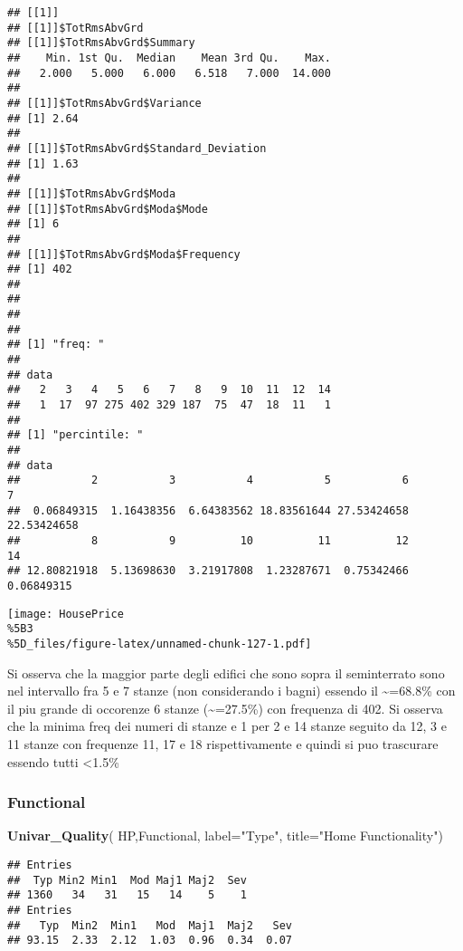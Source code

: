 \documentclass[
]{article}
\newenvironment{Shaded}{\begin{snugshade}}{\end{snugshade}}
\newcommand{\AttributeTok}[1]{\textcolor[rgb]{0.13,0.29,0.53}{#1}}
\newcommand{\FunctionTok}[1]{\textcolor[rgb]{0.13,0.29,0.53}{\textbf{#1}}}
\newcommand{\NormalTok}[1]{#1}
\newcommand{\StringTok}[1]{\textcolor[rgb]{0.31,0.60,0.02}{#1}}
\begin{document}
\begin{verbatim}
## [[1]]
## [[1]]$TotRmsAbvGrd
## [[1]]$TotRmsAbvGrd$Summary
##    Min. 1st Qu.  Median    Mean 3rd Qu.    Max. 
##   2.000   5.000   6.000   6.518   7.000  14.000 
## 
## [[1]]$TotRmsAbvGrd$Variance
## [1] 2.64
## 
## [[1]]$TotRmsAbvGrd$Standard_Deviation
## [1] 1.63
## 
## [[1]]$TotRmsAbvGrd$Moda
## [[1]]$TotRmsAbvGrd$Moda$Mode
## [1] 6
## 
## [[1]]$TotRmsAbvGrd$Moda$Frequency
## [1] 402
## 
## 
## 
## 
## [1] "freq: "
## 
## data
##   2   3   4   5   6   7   8   9  10  11  12  14 
##   1  17  97 275 402 329 187  75  47  18  11   1 
## 
## [1] "percintile: "
## 
## data
##           2           3           4           5           6           7 
##  0.06849315  1.16438356  6.64383562 18.83561644 27.53424658 22.53424658 
##           8           9          10          11          12          14 
## 12.80821918  5.13698630  3.21917808  1.23287671  0.75342466  0.06849315
\end{verbatim}

\texttt{[image: HousePrice\\\%5B3\\\%5D\_files/figure-latex/unnamed-chunk-127-1.pdf]}

Si osserva che la maggior parte degli edifici che sono sopra il
seminterrato sono nel intervallo fra 5 e 7 stanze (non considerando i
bagni) essendo il \textasciitilde=68.8\% con il piu grande di occorenze
6 stanze (\textasciitilde=27.5\%) con frequenza di 402. Si osserva che
la minima freq dei numeri di stanze e 1 per 2 e 14 stanze seguito da 12,
3 e 11 stanze con frequenze 11, 17 e 18 rispettivamente e quindi si puo
trascurare essendo tutti \textless1.5\%

\subsubsection{Functional}\label{functional}

\begin{Shaded}
\begin{Highlighting}[]
\FunctionTok{Univar\_Quality}\NormalTok{(}
\NormalTok{  HP,Functional,}
  \AttributeTok{label=}\StringTok{"Type"}\NormalTok{,}
  \AttributeTok{title=}\StringTok{"Home Functionality"}\NormalTok{)}
\end{Highlighting}
\end{Shaded}

\begin{verbatim}
## Entries
##  Typ Min2 Min1  Mod Maj1 Maj2  Sev 
## 1360   34   31   15   14    5    1 
## Entries
##   Typ  Min2  Min1   Mod  Maj1  Maj2   Sev 
## 93.15  2.33  2.12  1.03  0.96  0.34  0.07
\end{verbatim}
\end{document}
